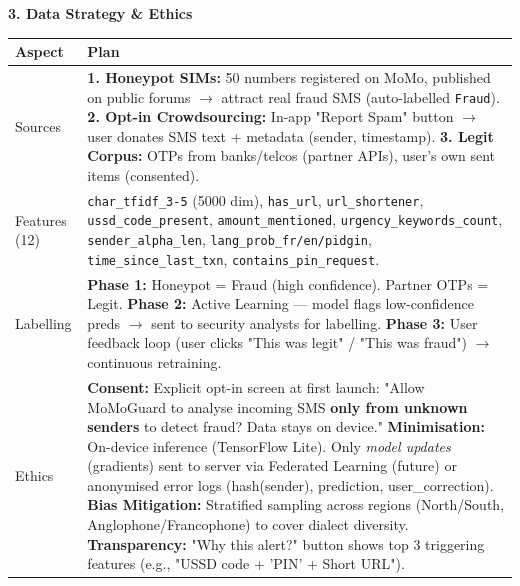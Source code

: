\documentclass[11pt]{article}
\begin{document}
\begin{exemplebox}
\textbf{3. Data Strategy \& Ethics}
\begin{center}
\begin{tabularx}{\linewidth}{|l|X|}
\hline
\rowcolor{popblueL}
\textbf{Aspect} & \textbf{Plan} \\
\hline
Sources & \textbf{1. Honeypot SIMs:} 50 numbers registered on MoMo, published on public forums $\rightarrow$ attract real fraud SMS (auto-labelled \texttt{Fraud}). \textbf{2. Opt-in Crowdsourcing:} In-app "Report Spam" button $\rightarrow$ user donates SMS text + metadata (sender, timestamp). \textbf{3. Legit Corpus:} OTPs from banks/telcos (partner APIs), user's own sent items (consented). \\
\hline
Features (12) & \texttt{char\_tfidf\_3-5} (5000 dim), \texttt{has\_url}, \texttt{url\_shortener}, \texttt{ussd\_code\_present}, \texttt{amount\_mentioned}, \texttt{urgency\_keywords\_count}, \texttt{sender\_alpha\_len}, \texttt{lang\_prob\_fr/en/pidgin}, \texttt{time\_since\_last\_txn}, \texttt{contains\_pin\_request}. \\
\hline
Labelling & \textbf{Phase 1:} Honeypot = Fraud (high confidence). Partner OTPs = Legit. \textbf{Phase 2:} Active Learning — model flags low-confidence preds $\rightarrow$ sent to security analysts for labelling. \textbf{Phase 3:} User feedback loop (user clicks "This was legit" / "This was fraud") $\rightarrow$ continuous retraining. \\
\hline
Ethics & \textbf{Consent:} Explicit opt-in screen at first launch: "Allow MoMoGuard to analyse incoming SMS \textbf{only from unknown senders} to detect fraud? Data stays on device." \textbf{Minimisation:} On-device inference (TensorFlow Lite). Only \emph{model updates} (gradients) sent to server via Federated Learning (future) or anonymised error logs (hash(sender), prediction, user\_correction). \textbf{Bias Mitigation:} Stratified sampling across regions (North/South, Anglophone/Francophone) to cover dialect diversity. \textbf{Transparency:} "Why this alert?" button shows top 3 triggering features (e.g., "USSD code + 'PIN' + Short URL"). \\
\hline
\end{tabularx}
\end{center}


\end{exemplebox}
\end{document}
